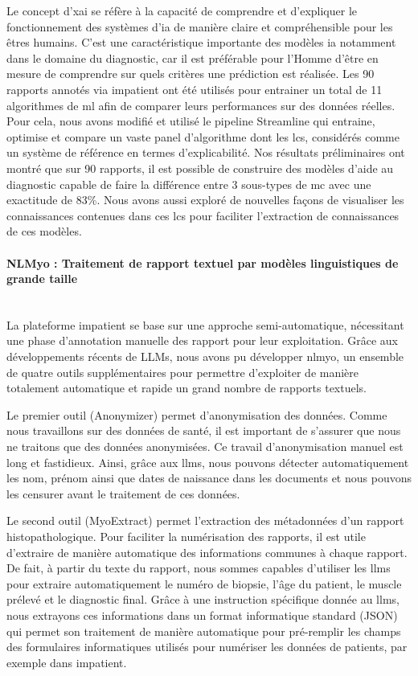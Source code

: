 Le concept d’\gls{xai} se réfère à la capacité de comprendre et d’expliquer le fonctionnement des systèmes d’\gls{ia} de manière claire et compréhensible pour les êtres humains. C’est une caractéristique importante des modèles \gls{ia} notamment dans le domaine du diagnostic, car il est préférable pour l’Homme d’être en mesure de comprendre sur quels critères une prédiction est réalisée. Les 90 rapports annotés via \gls{impatient} ont été utilisés pour entrainer un total de 11 algorithmes de \gls{ml} afin de comparer leurs performances sur des données réelles. Pour cela, nous avons modifié et utilisé le pipeline Streamline qui entraine, optimise et compare un vaste panel d’algorithme dont les \gls{lcs}, considérés comme un système de référence en termes d’explicabilité. Nos résultats préliminaires ont montré que sur 90 rapports, il est possible de construire des modèles d’aide au diagnostic capable de faire la différence entre 3 sous-types de \gls{mc} avec une exactitude de 83\%. Nous avons aussi exploré de nouvelles façons de visualiser les connaissances contenues dans ces \gls{lcs} pour faciliter l’extraction de connaissances de ces modèles.

\paragraph{\textbf{NLMyo : Traitement de rapport textuel par modèles linguistiques de grande taille}}\mbox{}\\

La plateforme \gls{impatient} se base sur une approche semi-automatique, nécessitant une phase d’annotation manuelle des rapport pour leur exploitation. Grâce aux développements récents de LLMs, nous avons pu développer \gls{nlmyo}, un ensemble de quatre outils supplémentaires pour permettre d’exploiter de manière totalement automatique et rapide un grand nombre de rapports textuels.

Le premier outil (Anonymizer) permet d’anonymisation des données. Comme nous travaillons sur des données de santé, il est important de s’assurer que nous ne traitons que des données anonymisées. Ce travail d’anonymisation manuel est long et fastidieux. Ainsi, grâce aux \gls{llms}, nous pouvons détecter automatiquement les nom, prénom ainsi que dates de naissance dans les documents et nous pouvons les censurer avant le traitement de ces données.

Le second outil (MyoExtract) permet l’extraction des métadonnées d’un rapport histopathologique. Pour faciliter la numérisation des rapports, il est utile d’extraire de manière automatique des informations communes à chaque rapport. De fait, à partir du texte du rapport, nous sommes capables d’utiliser les \gls{llms} pour extraire automatiquement le numéro de biopsie, l’âge du patient, le muscle prélevé et le diagnostic final. Grâce à une instruction spécifique donnée au \gls{llms}, nous extrayons ces informations dans un format informatique standard (JSON) qui permet son traitement de manière automatique pour pré-remplir les champs des formulaires informatiques utilisés pour numériser les données de patients, par exemple dans \gls{impatient}.

